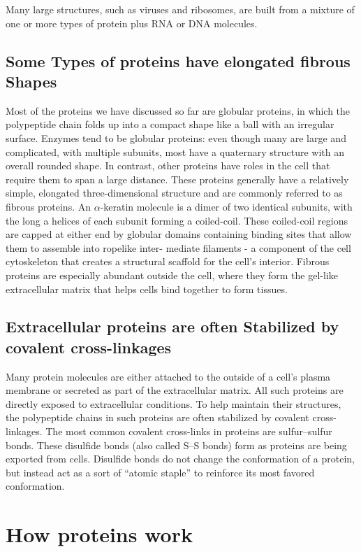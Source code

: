 Many large structures, such as viruses and ribosomes, are built from a
mixture of one or more types of protein plus RNA or DNA molecules.

\subsection{Some Types of proteins have elongated fibrous Shapes}

Most of the proteins we have discussed so far are globular proteins, in
which the polypeptide chain folds up into a compact shape like a ball
with an irregular surface. Enzymes tend to be globular proteins: even
though many are large and complicated, with multiple subunits, most
have a quaternary structure with an overall rounded shape.
In contrast, other proteins have roles in the cell that require them to
span a large distance. These proteins generally have a relatively simple,
elongated three-dimensional structure and are commonly referred to as
fibrous proteins.
An $\alpha$-keratin molecule is a dimer of two identical subunits, with the
long a helices of each subunit forming a coiled-coil.
These coiled-coil regions are capped at either end by globular domains
containing binding sites that allow them to assemble into ropelike inter-
mediate filaments - a component of the cell cytoskeleton that creates a
structural scaffold for the cell’s interior.
Fibrous proteins are especially abundant outside the cell, where they
form the gel-like extracellular matrix that helps cells bind together to form
tissues.

\subsection{Extracellular proteins are often Stabilized by covalent cross-linkages}

Many protein molecules are either attached to the outside of a cell’s
plasma membrane or secreted as part of the extracellular matrix. All such
proteins are directly exposed to extracellular conditions. To help maintain
their structures, the polypeptide chains in such proteins are often
stabilized by covalent cross-linkages.
The most common covalent cross-links
in proteins are sulfur–sulfur bonds. These disulfide bonds (also called
S–S bonds) form as proteins are being exported from cells.
Disulfide bonds do not change the
conformation of a protein, but instead act as a sort of “atomic staple”
to reinforce its most favored conformation.

\section{How proteins work}

